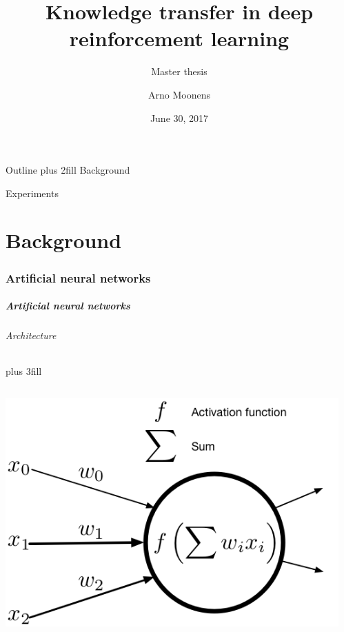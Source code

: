\documentclass{beamer}
\title{Knowledge transfer in deep reinforcement learning}
\subtitle{Master thesis}
\author{Arno Moonens}
\date{June 30, 2017}
\begin{document}
\frame{\titlepage}

\begin{frame}{Outline}
    \vskip0pt plus 2fill
  {\color{vubbleu}\large Background}
  \tableofcontents[part=1]

  {\color{vubbleu}\large Experiments}
  \tableofcontents[part=2]
\end{frame}

\part{Background}

\section{Artificial neural networks}
\begin{frame}[fragile]\frametitle{Artificial neural networks}
\framesubtitle{Architecture}
\vskip0pt plus 3fill
\begin{columns}
\begin{column}{0.5\textwidth}
\includegraphics[width=\linewidth]{neuron.png}
\end{column}
\vrule
\begin{column}{0.5\textwidth}

\end{column}
\end{columns}
\end{frame}
\end{document}
